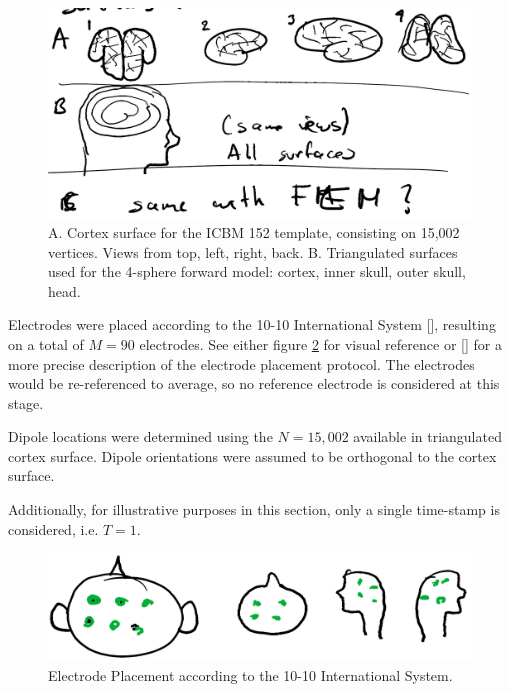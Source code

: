 \begin{figure}
\centering
\includegraphics[width=0.8\linewidth]{./img_dev/nsSetupForward}
\caption{A. Cortex surface for the ICBM 152 template, consisting on 15,002 vertices. Views from top, left, right, back. B. Triangulated surfaces used for the 4-sphere forward model: cortex, inner skull, outer skull, head.}
\label{fig:surfaces}
\end{figure}

Electrodes were placed according to the 10-10 International System [], resulting on a total of $M=90$ electrodes. See either figure \ref{fig:1010system} for visual reference or [] for a more precise description of the electrode placement protocol.
%
The electrodes would be re-referenced to average, so no reference electrode is considered at this stage.

Dipole locations were determined using the $N=15,002$ available in triangulated cortex surface.
%
Dipole orientations were assumed to be orthogonal to the cortex surface.

Additionally, for illustrative purposes in this section, only a single time-stamp is considered, i.e. $T=1$.

\begin{figure}
\centering
\includegraphics[width=0.8\linewidth]{./img_dev/nsElectrodeSetup}
\caption{Electrode Placement according to the 10-10 International System.}
\label{fig:1010system}
\end{figure}


